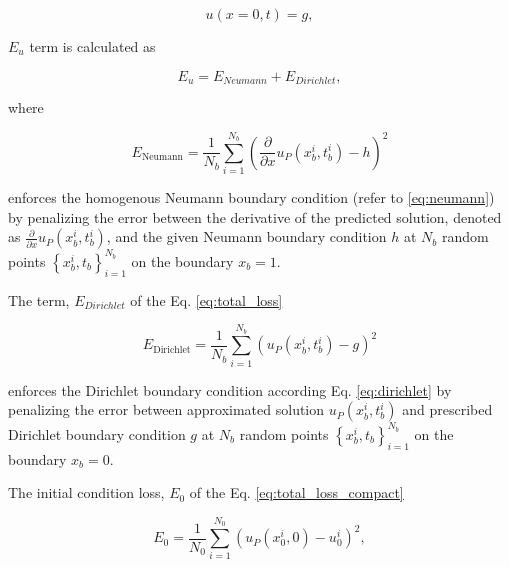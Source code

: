 \begin{equation}
    \label{eq:dirichlet}
     u(x=0,t)=g,
\end{equation}

\noindent $E_{u}$ term is calculated as

\begin{equation}
    \label{eq:total_loss}
    E_{u} = E_{Neumann} + E_{Dirichlet},
\end{equation}

\noindent where

\begin{equation}
    \label{eq:Neumann_pinn}   
    E_{\text {Neumann}}=\frac{1}{N_{b}} \sum_{i=1}^{N_{b}}\left(\frac{\partial}{\partial x} u_{P}\left(x_{b}^{i}, t_{b}^{i} \right)-h\right)^{2}
\end{equation}

\noindent  enforces the homogenous Neumann boundary condition (refer to \ref{eq:neumann}) by penalizing the error between
the derivative of the predicted solution, denoted as $\frac{\partial}{\partial x} u_{P}\left(x_{b}^{i}, t_{b}^{i}\right)$, 
and the given Neumann
boundary condition $h$ at $N_{b}$ random
points $\left\{x_{b}^{i}, t_{b}\right\}_{i=1}^{N_{b}}$ on the boundary $x_{b} = 1$.

\noindent The term, $E_{Dirichlet}$ of the Eq. \ref{eq:total_loss}

\begin{equation}
    \label{eq:Dirichlet_pinn}      
    E_{\text {Dirichlet}}=\frac{1}{N_{b}} \sum_{i=1}^{N_{b}}\left(u_{P}\left(x_{b}^{i}, t_{b}^{i} \right)-g\right)^{2}
\end{equation}

\noindent enforces the Dirichlet boundary condition according Eq. \ref{eq:dirichlet}  by penalizing the error 
between approximated solution $u_{P}(x_{b}^{i}, t_{b}^{i})$ and prescribed Dirichlet boundary condition $g$ 
at $N_{b}$ random points $\left\{x_{b}^{i}, t_{b} \right\}_{i=1}^{N_{b}}$ on the boundary $x_{b} = 0$. 

\vspace{4mm}

\noindent The initial condition loss, $E_{0}$ of the Eq. \ref{eq:total_loss_compact}

\begin{equation}
    \label{eq:Initial_pinn}  
    E_{0}=\frac{1}{N_{0}} \sum_{i=1}^{N_{0}}\left(u_{P}\left(x_{0}^{i}, 0 \right)-u_{0}^{i}\right)^{2},
\end{equation}

